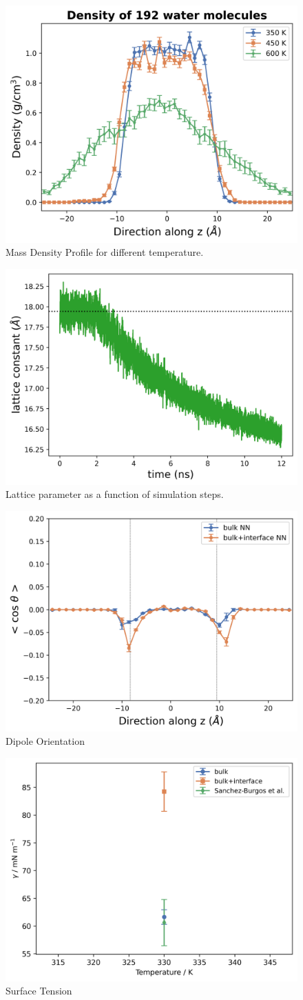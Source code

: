 \begin{figure}[h!]
  \centering
   \includegraphics[width=0.5\linewidth]{images/density.png}
  \caption{Mass Density Profile for different temperature. }
\end{figure}

\begin{figure}[h!]
  \centering
   \includegraphics[width=0.4\linewidth]{images/330K/conv-lattice.png}
  \caption{Lattice parameter as a function of simulation steps. }
\end{figure}

\begin{figure}[h!]
  \centering
   \includegraphics[width=0.5\linewidth]{images/dipole_dist.png}
  \caption{Dipole Orientation}
\end{figure}

\begin{figure}[h!]
  \centering
   \includegraphics[width=0.5\linewidth]{images/surface_tension.png}
  \caption{Surface Tension}
\end{figure}

